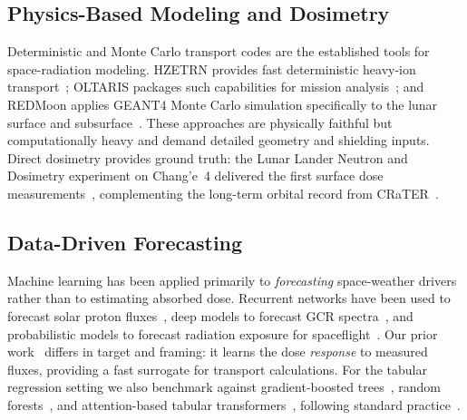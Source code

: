 \documentclass[graybox]{SNmult}
\begin{document}
\subsection{Physics-Based Modeling and Dosimetry}
Deterministic and Monte Carlo transport codes are the established tools for
space-radiation modeling. HZETRN provides fast deterministic heavy-ion
transport~\cite{Slaba2013}; OLTARIS packages such capabilities for mission
analysis~\cite{Singleterry2010}; and REDMoon applies GEANT4 Monte Carlo
simulation specifically to the lunar surface and subsurface~\cite{2022cosp...44.2697D}.
These approaches are physically faithful but computationally heavy and demand
detailed geometry and shielding inputs. Direct dosimetry provides ground truth:
the Lunar Lander Neutron and Dosimetry experiment on Chang'e~4 delivered the
first surface dose measurements~\cite{Wimmer2020,Zhang2020}, complementing the
long-term orbital record from CRaTER~\cite{Looper2020,schwadron2012lunar}.

\subsection{Data-Driven Forecasting}
Machine learning has been applied primarily to \emph{forecasting} space-weather
drivers rather than to estimating absorbed dose. Recurrent networks have been
used to forecast solar proton fluxes~\cite{Papagiannopoulos2023}, deep models to
forecast GCR spectra~\cite{Du2024}, and probabilistic models to forecast
radiation exposure for spaceflight~\cite{Zampieri2024}. Our prior
work~\cite{tummala2025selene} differs in target and framing: it learns the dose
\emph{response} to measured fluxes, providing a fast surrogate for transport
calculations. For the tabular regression setting we also benchmark against
gradient-boosted trees~\cite{chen2016xgboost}, random forests~\cite{breiman2001random},
and attention-based tabular transformers~\cite{somepalli2021saint}, following
standard practice~\cite{bishop2006pattern}.
\end{document}
